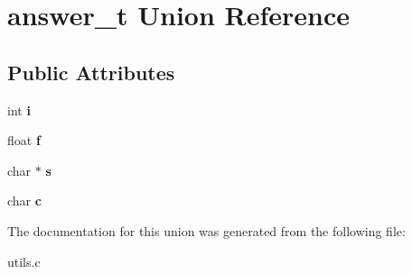 \hypertarget{unionanswer__t}{}\section{answer\+\_\+t Union Reference}
\label{unionanswer__t}
\subsection*{Public Attributes}
\begin{DoxyCompactItemize}
\item 
int {\bfseries i}\hypertarget{unionanswer__t_a21d3d2b485a0dcf04e6ec6a60bb4d4db}{}\label{unionanswer__t_a21d3d2b485a0dcf04e6ec6a60bb4d4db}

\item 
float {\bfseries f}\hypertarget{unionanswer__t_acc96d348401060d8beea19445f9fe184}{}\label{unionanswer__t_acc96d348401060d8beea19445f9fe184}

\item 
char $\ast$ {\bfseries s}\hypertarget{unionanswer__t_a0de66e8519f97035ac10688155603648}{}\label{unionanswer__t_a0de66e8519f97035ac10688155603648}

\item 
char {\bfseries c}\hypertarget{unionanswer__t_af43a34a48344362715fc22573522dbfa}{}\label{unionanswer__t_af43a34a48344362715fc22573522dbfa}

\end{DoxyCompactItemize}


The documentation for this union was generated from the following file\+:\begin{DoxyCompactItemize}
\item 
utils.\+c\end{DoxyCompactItemize}
